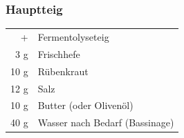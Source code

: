 \documentclass[10pt,a4paper,ngerman, DIV=16]{scrartcl}
\begin{document}
\subsubsection*{Hauptteig}
\begin{tabular}{r l}
    + & Fermentolyseteig                                      \\
    3 g & Frischhefe          \\
    10 g & Rübenkraut \\
    12 g & Salz                                                  \\
    10 g & Butter (oder Olivenöl)                                \\
    40 g & Wasser nach Bedarf (\Gls{Bassinage})                        \\
\end{tabular}\\
\end{document}

